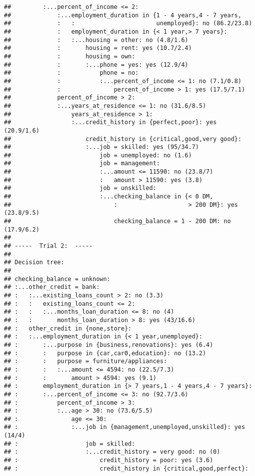 \documentclass[
]{article}
\begin{document}
\begin{verbatim}
##         :...percent_of_income <= 2:
##             :...employment_duration in {1 - 4 years,4 - 7 years,
##             :   :                       unemployed}: no (86.2/23.8)
##             :   employment_duration in {< 1 year,> 7 years}:
##             :   :...housing = other: no (4.8/1.6)
##             :       housing = rent: yes (10.7/2.4)
##             :       housing = own:
##             :       :...phone = yes: yes (12.9/4)
##             :           phone = no:
##             :           :...percent_of_income <= 1: no (7.1/0.8)
##             :               percent_of_income > 1: yes (17.5/7.1)
##             percent_of_income > 2:
##             :...years_at_residence <= 1: no (31.6/8.5)
##                 years_at_residence > 1:
##                 :...credit_history in {perfect,poor}: yes (20.9/1.6)
##                     credit_history in {critical,good,very good}:
##                     :...job = skilled: yes (95/34.7)
##                         job = unemployed: no (1.6)
##                         job = management:
##                         :...amount <= 11590: no (23.8/7)
##                         :   amount > 11590: yes (3.8)
##                         job = unskilled:
##                         :...checking_balance in {< 0 DM,
##                             :                    > 200 DM}: yes (23.8/9.5)
##                             checking_balance = 1 - 200 DM: no (17.9/6.2)
## 
## -----  Trial 2:  -----
## 
## Decision tree:
## 
## checking_balance = unknown:
## :...other_credit = bank:
## :   :...existing_loans_count > 2: no (3.3)
## :   :   existing_loans_count <= 2:
## :   :   :...months_loan_duration <= 8: no (4)
## :   :       months_loan_duration > 8: yes (43/16.6)
## :   other_credit in {none,store}:
## :   :...employment_duration in {< 1 year,unemployed}:
## :       :...purpose in {business,renovations}: yes (6.4)
## :       :   purpose in {car,car0,education}: no (13.2)
## :       :   purpose = furniture/appliances:
## :       :   :...amount <= 4594: no (22.5/7.3)
## :       :       amount > 4594: yes (9.1)
## :       employment_duration in {> 7 years,1 - 4 years,4 - 7 years}:
## :       :...percent_of_income <= 3: no (92.7/3.6)
## :           percent_of_income > 3:
## :           :...age > 30: no (73.6/5.5)
## :               age <= 30:
## :               :...job in {management,unemployed,unskilled}: yes (14/4)
## :                   job = skilled:
## :                   :...credit_history = very good: no (0)
## :                       credit_history = poor: yes (3.6)
## :                       credit_history in {critical,good,perfect}:

\end{verbatim}
\end{document}
